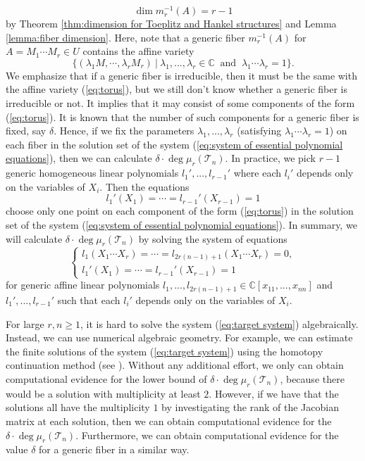 \documentclass[reqno]{amsart}
\theoremstyle{definition}
\numberwithin{equation}{section}
\begin{document}
\begin{equation*}
    \dim m_r^{-1}(A)=r-1
\end{equation*}
by Theorem \ref{thm:dimension for Toeplitz and Hankel structures} and Lemma \ref{lemma:fiber dimension}. Here, note that a generic fiber $m_r^{-1}(A)$ for $A=M_1\cdots M_r \in U$ contains the affine variety
\begin{equation}\label{eq:torus}
    \{(\lambda_1 M, \cdots, \lambda_r M_r)~|~\lambda_1,...,\lambda_r \in \mathbb{C}~\text{ and }~\lambda_1\cdots \lambda_r=1\}.
\end{equation}
We emphasize that if a generic fiber is irreducible, then it must be the same with the affine variety (\ref{eq:torus}), but we still don't know whether a generic fiber is irreducible or not. It implies that it may consist of some components of the form (\ref{eq:torus}). It is known that the number of such components for a generic fiber is fixed, say $\delta$. Hence, if we fix the parameters $\lambda_1,...,\lambda_{r}$ (satisfying $\lambda_1\cdots \lambda_r=1$) on each fiber in the solution set of the system (\ref{eq:system of essential polynomial equations}), then we can calculate $\delta \cdot \deg \mu_r(\mathcal{T}_n)$. In practice, we pick $r-1$ generic homogeneous linear polynomials $l_1',...,l_{r-1}'$ where each $l_i'$ depends only on the variables of $X_i$. Then the equations
\begin{equation*}
    l_1'(X_1)=\cdots=l_{r-1}'(X_{r-1})=1
\end{equation*}
choose only one point on each component of the form (\ref{eq:torus}) in the solution set of the system (\ref{eq:system of essential polynomial equations}). In summary, we will calculate $\delta \cdot \deg \mu_r(\mathcal{T}_n)$ by solving the system of equations
\begin{equation}\label{eq:target system}
    \begin{cases}
        l_1(X_1\cdots X_r)=\cdots =l_{2r(n-1)+1}(X_1\cdots X_r)=0,\\
        l_1'(X_1)=\cdots=l_{r-1}'(X_{r-1})=1
    \end{cases}
\end{equation}
for generic affine linear polynomials $l_1,...,l_{2r(n-1)+1} \in \mathbb{C}[x_{11},...,x_{nn}]$ and $l_1',...,l_{r-1}'$ such that each $l_i'$ depends only on the variables of $X_i$. 

For large $r,n \geq 1$, it is hard to solve the system (\ref{eq:target system}) algebraically. Instead, we can use numerical algebraic geometry. For example, we can estimate the finite solutions of the system (\ref{eq:target system}) using the homotopy continuation method (see \cite{MR2881262}). Without any additional effort, we only can obtain computational evidence for the lower bound of $\delta \cdot \deg \mu_r(\mathcal{T}_n)$, because there would be a solution with multiplicity at least $2$. However, if we have that the solutions all have the multiplicity $1$ by investigating the rank of the Jacobian matrix at each solution, then we can obtain computational evidence for the $\delta \cdot \deg \mu_r(\mathcal{T}_n)$. Furthermore, we can obtain computational evidence for the value $\delta$ for a generic fiber in a similar way.
\end{document}
